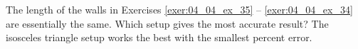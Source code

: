 {The length of the walls in Exercises \ref{exer:04_04_ex_35} -- \ref{exer:04_04_ex_34} are essentially the same. Which setup gives the most accurate result?
}
{The isosceles triangle setup works the best with the smallest percent error.
}

